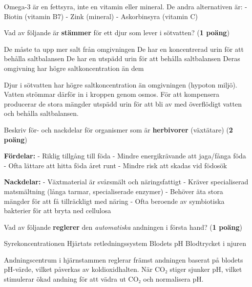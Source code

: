 \documentclass{exam}
\begin{document}
\begin{questions}
\begin{solution}
Omega-3 är en fettsyra, inte en vitamin eller mineral. De andra alternativen är:
- Biotin (vitamin B7)
- Zink (mineral)
- Askorbinsyra (vitamin C)
\end{solution}

\question Vad av följande är \textbf{stämmer} för ett djur som lever i sötvatten? (\textbf{1 poäng})
\begin{checkboxes}
    \choice De måste ta upp mer salt från omgivningen
    \choice De har en koncentrerad urin för att behålla saltbalansen
    \correctchoice De har en utspädd urin för att behålla saltbalansen
    \choice Deras omgivning har högre saltkoncentration än dem
\end{checkboxes}

\begin{solution}
Djur i sötvatten har högre saltkoncentration än omgivningen (hypoton miljö). Vatten strömmar därför in i kroppen genom osmos. För att kompensera producerar de stora mängder utspädd urin för att bli av med överflödigt vatten och behålla saltbalansen.
\end{solution}

\question Beskriv för- och nackdelar för organismer som är \textbf{herbivorer} (växtätare) (\textbf{2 poäng})
\begin{solution}
\textbf{Fördelar:}
- Riklig tillgång till föda
- Mindre energikrävande att jaga/fånga föda
- Ofta lättare att hitta föda året runt
- Mindre risk att skadas vid födosök

\textbf{Nackdelar:}
- Växtmaterial är svårsmält och näringsfattigt
- Kräver specialiserad matsmältning (långa tarmar, specialiserade enzymer)
- Behöver äta stora mängder för att få tillräckligt med näring
- Ofta beroende av symbiotiska bakterier för att bryta ned cellulosa
\end{solution}

\question Vad av följande \textbf{reglerer} den \textit{automatiska} andningen i första hand? (\textbf{1 poäng})
\begin{checkboxes}
    \choice Syrekoncentrationen
    \choice Hjärtats retledningssystem
    \correctchoice Blodets pH
    \choice Blodtrycket i njuren
\end{checkboxes}

\begin{solution}
Andningscentrum i hjärnstammen reglerar främst andningen baserat på blodets pH-värde, vilket påverkas av koldioxidhalten. När CO₂ stiger sjunker pH, vilket stimulerar ökad andning för att vädra ut CO₂ och normalisera pH.
\end{solution}


\end{questions}
\end{document}
